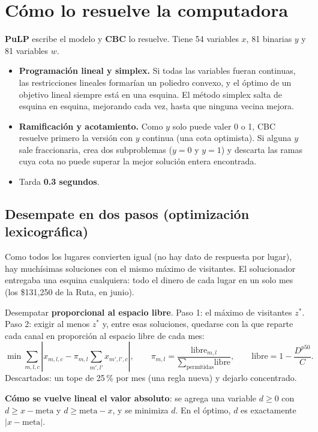 \section{Cómo lo resuelve la computadora}
\textbf{PuLP} escribe el modelo y \textbf{CBC} lo resuelve. Tiene 54 variables $x$, 81 binarias $y$ y 81 variables $w$.
\begin{itemize}
\item \textbf{Programación lineal y simplex.} Si todas las variables fueran continuas, las restricciones lineales formarían
  un poliedro convexo, y el óptimo de un objetivo lineal siempre está en una esquina. El método simplex salta de esquina
  en esquina, mejorando cada vez, hasta que ninguna vecina mejora.
\item \textbf{Ramificación y acotamiento.} Como $y$ solo puede valer 0 o 1, CBC resuelve primero la versión con $y$ continua
  (una cota optimista). Si alguna $y$ sale fraccionaria, crea dos subproblemas ($y=0$ y $y=1$) y descarta las ramas cuya
  cota no puede superar la mejor solución entera encontrada.
\item Tarda \textbf{0.3 segundos}.
\end{itemize}

\subsection{Desempate en dos pasos (optimización lexicográfica)}
Como todos los lugares convierten igual (no hay dato de respuesta por lugar), hay muchísimas soluciones con el mismo máximo
de visitantes. El solucionador entregaba una esquina cualquiera: todo el dinero de cada lugar en un solo mes (los
\$131,250 de la Ruta, en junio).
\begin{decision}
Desempatar \textbf{proporcional al espacio libre}. Paso 1: el máximo de visitantes $z^*$. Paso 2: exigir al menos $z^*$ y,
entre esas soluciones, quedarse con la que reparte cada canal en proporción al espacio libre de cada mes:
\[
\min\sum_{m,l,c}\left|x_{m,l,c}-\pi_{m,l}\sum_{m',l'}x_{m',l',c}\right|,\qquad
\pi_{m,l}=\frac{\text{libre}_{m,l}}{\sum_{\text{permitidas}}\text{libre}},\qquad \text{libre}=1-\frac{D^{p50}}{C} .
\]
Descartados: un tope de 25\,\% por mes (una regla nueva) y dejarlo concentrado.
\end{decision}
\textbf{Cómo se vuelve lineal el valor absoluto}: se agrega una variable $d\ge0$ con $d\ge x-\text{meta}$ y
$d\ge\text{meta}-x$, y se minimiza $d$. En el óptimo, $d$ es exactamente $|x-\text{meta}|$.

